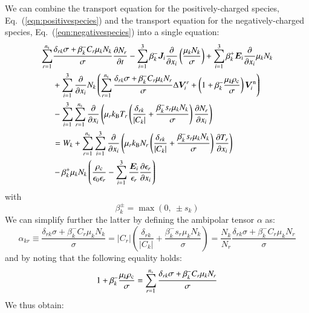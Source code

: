 \documentclass{warpdoc}
\newcommand{\alb}{\vspace{0.1cm}\\} %
\newcommand{\ns}{{n_{\rm s}}}
\renewcommand{\vec}[1]{\bm{#1}}
\begin{document}
We can combine the transport equation for the positively-charged species, Eq.\ (\ref{eqn:positivespecies}) and the transport equation for the negatively-charged species, Eq.\ (\ref{eqn:negativespecies}) into a single equation:
%
\begin{align}
  \sum_{r=1}^{\ns} &\frac{\delta_{rk}\sigma + \beta^-_k C_r  \mu_k N_k}{\sigma} \frac{\partial N_r}{\partial t}  
-  \sum_{i=1}^3 \beta_k^- \vec{J}_i \frac{\partial}{\partial x_i}  \left( \frac{\mu_k N_k}{\sigma} 
\right) 
+ \sum_{i=1}^3 \beta_k^+ \vec{E}_i \frac{\partial }{\partial x_i} \mu_{k} N_{k}\nonumber\alb
&+ \sum_{i=1}^3 \frac{\partial}{\partial x_i}   N_k \left(\sum_{r=1}^\ns \frac{\delta_{rk}\sigma+\beta_k^- C_r  \mu_k N_r}{\sigma} \Delta \vec{V}_i^r + \left(1+\beta_k^- \frac{\mu_k\rho_{\rm c}}{\sigma}\right)\vec{V}^{\rm n}_i\right) \nonumber\alb
&- \sum_{i=1}^3 \sum_{r=1}^{\ns} \frac{\partial}{\partial x_i} \left(\mu_r k_{\rm B} T_r\left(\frac{ \delta_{rk} }{ |C_k|}+   \frac{\beta_k^- s_r \mu_k N_k }{\sigma}\right)  \frac{\partial N_r}{\partial x_i}\right) 
\nonumber\alb
&= W_k
+ \sum_{r=1}^\ns \sum_{i=1}^3  \frac{\partial}{\partial x_i} \left( \mu_r k_{\rm B} N_r   \left(\frac{\delta_{rk}}{|C_k|}+\frac{\beta_k^- s_r \mu_k N_k}{\sigma}\right)  \frac{\partial T_r}{\partial x_i} \right)
\nonumber\alb
&-\beta_k^+ \mu_{k} N_{k}\left(
  \frac{\rho_{\rm c}}{\epsilon_0\epsilon_r}
  -\sum_{i=1}^3 \frac{\vec{E}_i}{\epsilon_r} \frac{\partial \epsilon_r}{\partial x_i}  
\right)  
\end{align}
%
with
%
\begin{equation}
\beta_k^\pm = \max(0,~\pm s_k)
\end{equation}
%
We can simplify further the latter by defining the ambipolar tensor $\alpha$ as:
%
\begin{equation}
\alpha_{kr} \equiv
  \frac{\delta_{rk}\sigma+ \beta_k^- C_r  \mu_k N_k}{\sigma} 
=  |C_r| \left( \frac{\delta_{rk}}{|C_k|}+  \frac{ \beta_k^- s_r \mu_k N_k}{\sigma}\right)
=  \frac{N_k}{N_r}\frac{\delta_{rk}\sigma+ \beta_k^- C_r  \mu_k N_r}{\sigma} 
\end{equation}
%
and by noting that the following equality holds:
%
\begin{equation}
1+\beta_k^- \frac{\mu_k\rho_{\rm c}}{\sigma} 
= \sum_{r=1}^\ns \frac{\delta_{rk}\sigma+ \beta_k^- C_r  \mu_k N_r}{\sigma} 
 \end{equation}
%
We thus obtain:
%
\end{document}

